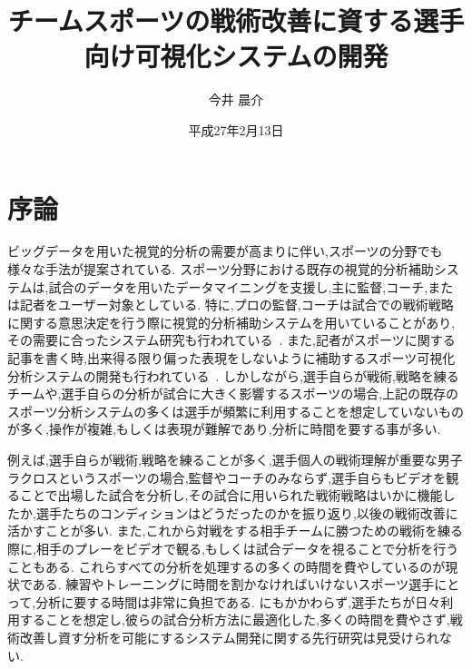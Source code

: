 \documentclass[sotsuron]{kuee}
\title{チームスポーツの戦術改善に資する選手向け可視化システムの開発}
\author{今井 晨介}
\date{平成27年2月13日}
\begin{document}
\maketitle	
\tableofcontents


\chapter{序論}
	ビッグデータを用いた視覚的分析の需要が高まりに伴い,スポーツの分野でも様々な手法が提案されている.  スポーツ分野における既存の視覚的分析補助システムは,試合のデータを用いたデータマイニングを支援し,主に監督,コーチ,または記者をユーザー対象としている.  
	特に,プロの監督,コーチは試合での戦術戦略に関する意思決定を行う際に視覚的分析補助システムを用いていることがあり,その需要に合ったシステム研究も行われている~\cite{SoccerStory,SnapShot,TenniVis}.  
	また,記者がスポーツに関する記事を書く時,出来得る限り偏った表現をしないように補助するスポーツ可視化分析システムの開発も行われている~\cite{SoccerStory}.  
	しかしながら,選手自らが戦術,戦略を練るチームや,選手自らの分析が試合に大きく影響するスポーツの場合,上記の既存のスポーツ分析システムの多くは選手が頻繁に利用することを想定していないものが多く,操作が複雑,もしくは表現が難解であり,分析に時間を要する事が多い.  
	
	例えば,選手自らが戦術,戦略を練ることが多く,選手個人の戦術理解が重要な男子ラクロスというスポーツの場合,監督やコーチのみならず,選手自らもビデオを観ることで出場した試合を分析し,その試合に用いられた戦術戦略はいかに機能したか,選手たちのコンディションはどうだったのかを振り返り,以後の戦術改善に活かすことが多い.  また,これから対戦をする相手チームに勝つための戦術を練る際に,相手のプレーをビデオで観る,もしくは試合データを視ることで分析を行うこともある.  これらすべての分析を処理するの多くの時間を費やしているのが現状である.  
	練習やトレーニングに時間を割かなければいけないスポーツ選手にとって,分析に要する時間は非常に負担である.  
	にもかかわらず,選手たちが日々利用することを想定し,彼らの試合分析方法に最適化した,多くの時間を費やさず,戦術改善し資す分析を可能にするシステム開発に関する先行研究は見受けられない.  
	
\end{document}
